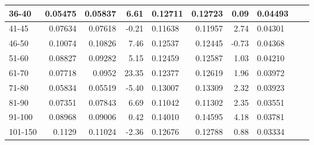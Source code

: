 \begin{table*}[h!]
\begin{tabular}{|l|r|r|r||l|r|r||l|l|l|}
        36-40   & 0.05475                                 & 0.05837                        & 6.61                             & 0.12711 & 0.12723                  & 0.09                       & 0.04493 &                        &                        \\ \hline
        41-45   & 0.07634                                 & 0.07618                        & -0.21                            & 0.11638 & 0.11957                  & 2.74                       & 0.04301 &                        &                        \\ \hline
        46-50   & 0.10074                                 & 0.10826                        & 7.46                             & 0.12537 & 0.12445                  & -0.73                      & 0.04368 &                        &                        \\ \hline
        51-60   & 0.08827                                 & 0.09282                        & 5.15                             & 0.12459 & 0.12587                  & 1.03                       & 0.04210 &                        &                        \\ \hline
        61-70   & 0.07718                                 & 0.0952                         & 23.35                            & 0.12377 & 0.12619                  & 1.96                       & 0.03972 &                        &                        \\ \hline
        71-80   & 0.05834                                 & 0.05519                        & -5.40                            & 0.13007 & 0.13309                  & 2.32                       & 0.03923 &                        &                        \\ \hline
        81-90   & 0.07351                                 & 0.07843                        & 6.69                             & 0.11042 & 0.11302                  & 2.35                       & 0.03551 &                        &                        \\ \hline
        91-100  & 0.08968                                 & 0.09006                        & 0.42                             & 0.14010 & 0.14595                  & 4.18                       & 0.03781 &                        &                        \\ \hline
        101-150 & 0.1129                                  & 0.11024                        & -2.36                            & 0.12676 & 0.12788                  & 0.88                       & 0.03334 &                        &                        \\ \hline

\end{tabular}
\end{table*}
